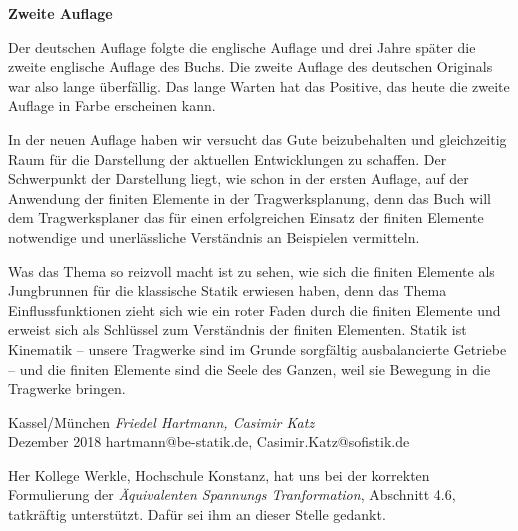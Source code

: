 
\begin{flushleft}\large{\bf{Zweite Auflage}} \end{flushleft}

Der deutschen Auflage folgte die englische Auflage und drei Jahre sp\"{a}ter die zweite englische Auflage des Buchs. Die zweite Auflage des deutschen Originals war also lange \"{u}berf\"{a}llig. Das lange Warten hat das Positive, das heute die zweite Auflage in Farbe erscheinen kann. 

In der neuen Auflage haben wir versucht das Gute beizubehalten und gleichzeitig Raum f\"{u}r die Darstellung der aktuellen Entwicklungen zu schaffen. Der Schwerpunkt der Darstellung liegt, wie schon in der ersten Auflage, auf der Anwendung der finiten Elemente in der Tragwerksplanung, denn das Buch will dem Tragwerksplaner das f\"{u}r einen erfolgreichen Einsatz der finiten Elemente notwendige und unerl\"{a}ssliche Verst\"{a}ndnis an Beispielen vermitteln.

Was das Thema so reizvoll macht ist zu sehen, wie sich die finiten Elemente als Jungbrunnen f\"{u}r die klassische Statik erwiesen haben, denn das Thema Einflussfunktionen zieht sich wie ein roter Faden durch die finiten Elemente und erweist sich als Schl\"{u}ssel zum Verst\"{a}ndnis der finiten Elementen. Statik ist Kinematik -- unsere Tragwerke sind im Grunde sorgf\"{a}ltig ausbalancierte Getriebe -- und die finiten Elemente sind die Seele des Ganzen, weil sie Bewegung in die Tragwerke bringen.

\begin{flushright}\noindent
Kassel/M\"{u}nchen  {\hfill {\it Friedel Hartmann, Casimir Katz}}\\\vspace{0.1cm}
Dezember 2018   {\hfill {hartmann@be-statik.de, Casimir.Katz@sofistik.de}}\\
\end{flushright}



\begin{acknowledgement}
Her Kollege Werkle, Hochschule Konstanz, hat uns bei der korrekten Formulierung der {\em \"{A}quivalenten Spannungs Tranformation\/}, Abschnitt 4.6, tatkr\"{a}ftig unterst\"{u}tzt. Daf\"{u}r sei ihm an dieser Stelle gedankt.\\
\end{acknowledgement}


